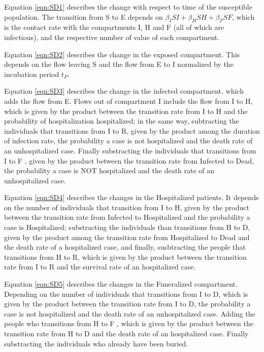 

%



Equation \ref{eqn:SD1} describes the change with respect to time of the susceptible population. The transition from S to E depends on $\beta_{I}SI+\beta_{H}SH+\beta_{F}SF$, which is the contact rate with the compartments I, H and F (all of which are infectious), and the respective number of value of each compartment.

Equation \ref{eqn:SD2} describes the change in the exposed compartment. This depends on the flow leaving S and the flow from E to I normalized by the incubation period $t_P$.

Equation \ref{eqn:SD3} describes the change in the infected compartment, which adds the flow from E. Flows out of compartment I include the flow from I to H, which is given by the product between the transition rate from I to H and the probability of hospitalization hospitalized; in the same way, subtracting the individuals that transitions from I to R, given by  the product among the duration of infection rate, the probability a case is not hospitalized and the death rate of an unhospitalized case. Finally substracting the individuals that transitions from I to F , given by the product between the transition rate from Infected to Dead,  the probability a case is NOT hospitalized and the death rate of an unhospitalized case.

Equation \ref{eqn:SD4} describes the changes in the Hospitalized patients. It depends on the number of individuals that transition from I to H, given by the  product between the transition rate from Infected to Hospitalized and the probability a case is Hospitalized;  substracting the individuals than transitions from H to D, given by the product among the transition rate from Hospitalized to Dead and the death rate of a hospitalized case, and finally, susbtracting the people that transitions from H to R, which is given by the product between the transition rate from I to R and the survival rate of an hospitalized case.

Equation \ref{eqn:SD5} describes the changes in the Funeralized compartment.  Depending on the number of individuals that transitions from I to D, which is given by the product between the transition rate from I to D, the probability a case is not hospitalized and the death rate of an unhospitalized case. Adding the people who transitions from H to F , which is given by the product between the transition rate from H to D and the death rate of an hospitalized case. Finally substracting the individuals who already have been buried.

